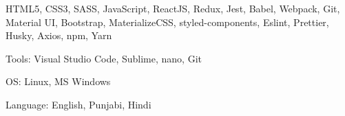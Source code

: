 \cventry{}
    {}
    {}
    {HTML5, CSS3, SASS, JavaScript, ReactJS, Redux, Jest, Babel, Webpack, Git, Material UI, Bootstrap, MaterializeCSS, styled-components,  Eslint, Prettier, Husky, Axios, npm, Yarn}
    {}
    {}

\cventry{}
    {Tools:}
    {}
    {Visual Studio Code, Sublime, nano, Git}
    {}
    {}

\cventry{}
    {OS:}
    {}
    {Linux, MS Windows}
    {}
    {}


\cventry{}
    {Language:}
    {}
    {English, Punjabi, Hindi}
    {}
    {}


